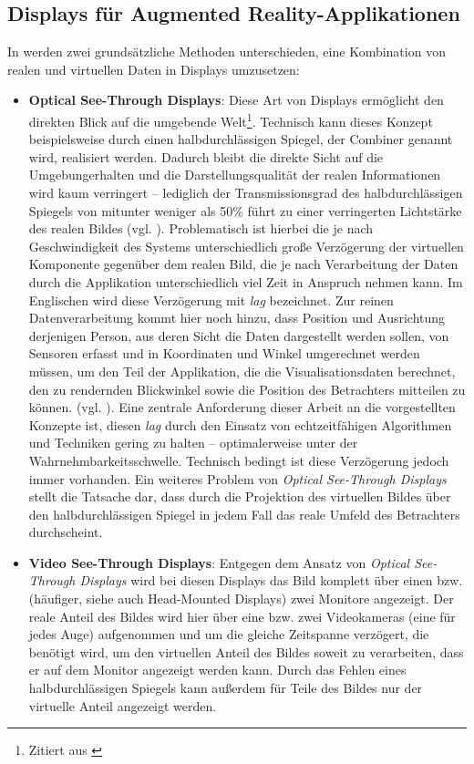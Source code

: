 \documentclass[ngerman,pdftex,paper=A4,DIV=calc,titlepage,12pt]{scrartcl}
\newtheorem[L]{boxedDefinition}{Definition}
\newcommand{\footnoteremember}[2]{\footnote{#2}\newcounter{#1}\setcounter{#1}{\value{footnote}}}
\newcommand{\footnoterecall}[1]{\footnotemark[\value{#1}]}
\begin{document}
\subsection{Displays für Augmented Reality-Applikationen}\label{ssec:ardisplays}
In \cite[Kapitel 2.2, Seite 21]{Toe2010} werden zwei grundsätzliche Methoden unterschieden, eine Kombination von realen und virtuellen Daten in Displays umzusetzen:
\begin{itemize}
 \item \textbf{Optical See-Through Displays}: Diese Art von Displays ermöglicht den \glqq direkten Blick auf die umgebende Welt\grqq\footnoteremember{f:Toe2010-S21}{Zitiert aus \cite[Kapitel 2.2, Seite 21f.]{Toe2010}}. Technisch kann dieses Konzept beispielsweise durch einen halbdurchlässigen Spiegel, der Combiner genannt wird, realisiert werden. Dadurch bleibt die \glqq direkte Sicht auf die Umgebung\grqq\footnoterecall{f:Toe2010-S21} erhalten und die Darstellungsqualität der realen Informationen wird kaum verringert -- lediglich der Transmissionsgrad des halbdurchlässigen Spiegels von mitunter weniger als 50\% führt zu einer verringerten Lichtstärke des realen Bildes (vgl. \cite[Kapitel 3.1.3, Seite 7]{Suthau2002DE}). Problematisch ist hierbei die je nach Geschwindigkeit des Systems unterschiedlich große Verzögerung der virtuellen Komponente gegenüber dem realen Bild, die je nach Verarbeitung der Daten durch die Applikation unterschiedlich viel Zeit in Anspruch nehmen kann. Im Englischen wird diese Verzögerung mit \textit{lag} bezeichnet. Zur reinen Datenverarbeitung kommt hier noch hinzu, dass Position und Ausrichtung derjenigen Person, aus deren Sicht die Daten dargestellt werden sollen, von Sensoren erfasst und in Koordinaten und Winkel umgerechnet werden müssen, um den Teil der Applikation, die die Visualisationsdaten berechnet, den zu rendernden Blickwinkel sowie die Position des Betrachters mitteilen zu können. (vgl. \cite[Kapitel 2.2, Seite 21f.]{Toe2010}). Eine zentrale Anforderung dieser Arbeit an die vorgestellten Konzepte ist, diesen \textit{lag} durch den Einsatz von echtzeitfähigen Algorithmen und Techniken gering zu halten -- optimalerweise unter der Wahrnehmbarkeitsschwelle. Technisch bedingt ist diese Verzögerung jedoch immer vorhanden. Ein weiteres Problem von \textit{Optical See-Through Displays} stellt die Tatsache dar, dass durch die Projektion des virtuellen Bildes über den halbdurchlässigen Spiegel in jedem Fall das reale Umfeld des Betrachters durchscheint.
 \item \textbf{Video See-Through Displays}: Entgegen dem Ansatz von \textit{Optical See-Through Displays} wird bei diesen Displays das Bild komplett über einen bzw. (häufiger, siehe auch \glqq Head-Mounted Displays\grqq) zwei Monitore angezeigt. Der reale Anteil des Bildes wird hier über eine bzw. zwei Videokameras (eine für jedes Auge) aufgenommen und um die gleiche Zeitspanne verzögert, die benötigt wird, um den virtuellen Anteil des Bildes soweit zu verarbeiten, dass er auf dem Monitor angezeigt werden kann. Durch das Fehlen eines halbdurchlässigen Spiegels kann außerdem für Teile des Bildes nur der virtuelle Anteil angezeigt werden.

\end{itemize}
\end{document}
